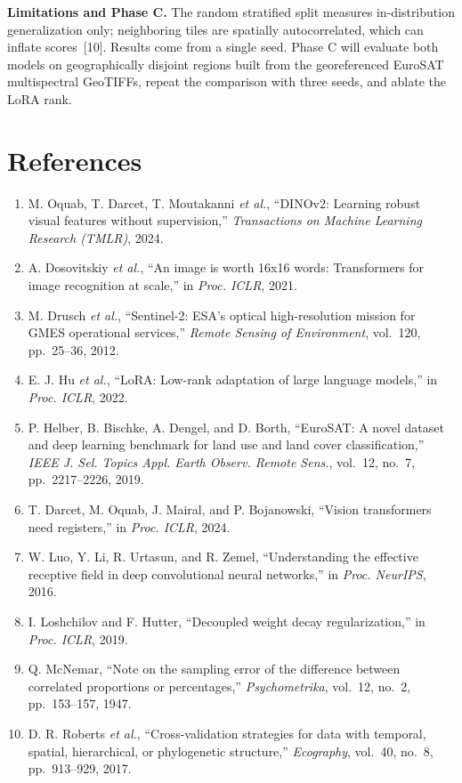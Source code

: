 \documentclass[10pt,a4paper]{article}
\newcommand{\para}[1]{\textbf{#1}\enspace}
\begin{document}
\para{Limitations and Phase C.} The random stratified split measures in-distribution generalization only; neighboring tiles are spatially autocorrelated, which can inflate scores~[10]. Results come from a single seed. Phase C will evaluate both models on geographically disjoint regions built from the georeferenced EuroSAT multispectral GeoTIFFs, repeat the comparison with three seeds, and ablate the LoRA rank.

\section*{References}
\vspace{-0.3em}
{\footnotesize
\begin{enumerate}\setlength{\itemsep}{0pt}\setlength{\parskip}{0pt}\setlength{\leftskip}{-0.6em}
\renewcommand{\labelenumi}{[\arabic{enumi}]}
\item M. Oquab, T. Darcet, T. Moutakanni \emph{et al.}, ``DINOv2: Learning robust visual features without supervision,'' \emph{Transactions on Machine Learning Research (TMLR)}, 2024.
\item A. Dosovitskiy \emph{et al.}, ``An image is worth 16x16 words: Transformers for image recognition at scale,'' in \emph{Proc. ICLR}, 2021.
\item M. Drusch \emph{et al.}, ``Sentinel-2: ESA's optical high-resolution mission for GMES operational services,'' \emph{Remote Sensing of Environment}, vol.~120, pp.~25--36, 2012.
\item E. J. Hu \emph{et al.}, ``LoRA: Low-rank adaptation of large language models,'' in \emph{Proc. ICLR}, 2022.
\item P. Helber, B. Bischke, A. Dengel, and D. Borth, ``EuroSAT: A novel dataset and deep learning benchmark for land use and land cover classification,'' \emph{IEEE J. Sel. Topics Appl. Earth Observ. Remote Sens.}, vol.~12, no.~7, pp.~2217--2226, 2019.
\item T. Darcet, M. Oquab, J. Mairal, and P. Bojanowski, ``Vision transformers need registers,'' in \emph{Proc. ICLR}, 2024.
\item W. Luo, Y. Li, R. Urtasun, and R. Zemel, ``Understanding the effective receptive field in deep convolutional neural networks,'' in \emph{Proc. NeurIPS}, 2016.
\item I. Loshchilov and F. Hutter, ``Decoupled weight decay regularization,'' in \emph{Proc. ICLR}, 2019.
\item Q. McNemar, ``Note on the sampling error of the difference between correlated proportions or percentages,'' \emph{Psychometrika}, vol.~12, no.~2, pp.~153--157, 1947.
\item D. R. Roberts \emph{et al.}, ``Cross-validation strategies for data with temporal, spatial, hierarchical, or phylogenetic structure,'' \emph{Ecography}, vol.~40, no.~8, pp.~913--929, 2017.
\end{enumerate}}
\end{document}
